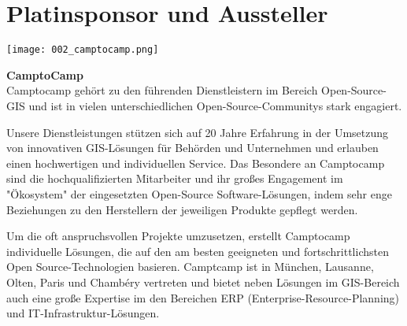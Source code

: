 \section*{Platinsponsor und Aussteller}
  \texttt{[image: 002\_camptocamp.png]}
  \vspace{1.0\baselineskip}
  
\noindent
    {\bfseries CamptoCamp}\\
    Camptocamp gehört zu den führenden Dienstleistern im Bereich Open-Source-GIS und ist in vielen unterschiedlichen Open-Source-Communitys stark engagiert.

\noindent
Unsere Dienstleistungen stützen sich auf 20 Jahre Erfahrung in der Umsetzung von innovativen GIS-Lösungen für Behörden und Unternehmen und erlauben einen hochwertigen und individuellen Service. Das Besondere an Camptocamp sind die hochqualifizierten Mitarbeiter und ihr großes Engagement im "Ökosystem" der eingesetzten Open-Source Software-Lösungen, indem sehr enge Beziehungen zu den Herstellern der jeweiligen Produkte gepflegt werden.

\noindent
Um die oft anspruchsvollen Projekte umzusetzen, erstellt Camptocamp individuelle Lösungen, die auf den am besten geeigneten und fortschrittlichsten Open Source-Technologien basieren. Camptcamp ist in München, Lausanne, Olten, Paris und Chambéry vertreten und bietet neben Lösungen im GIS-Bereich auch eine große Expertise im den Bereichen ERP (Enterprise-Resource-Planning) und IT-Infrastruktur-Lösungen.
